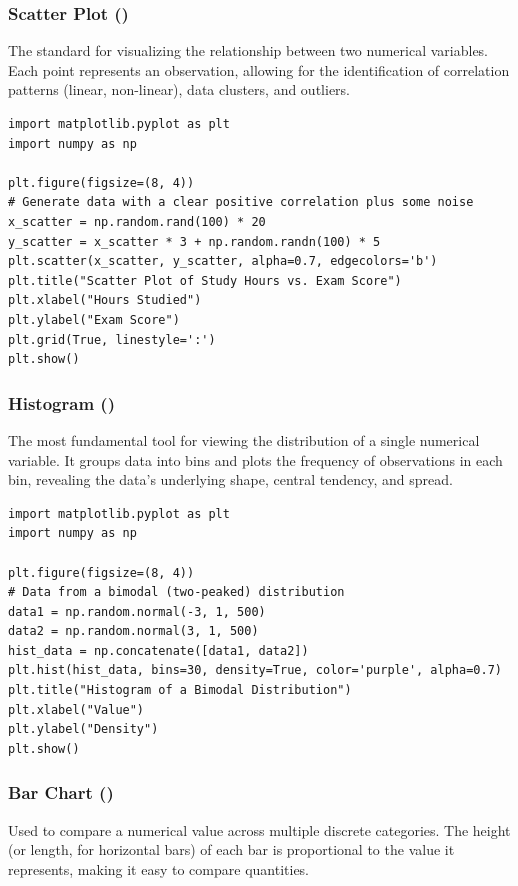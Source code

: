 \subsubsection*{Scatter Plot ()}
The standard for visualizing the relationship between two numerical variables. Each point represents an observation, allowing for the identification of correlation patterns (linear, non-linear), data clusters, and outliers.

\begin{example}
\text{ }\begin{verbatim}
import matplotlib.pyplot as plt
import numpy as np

plt.figure(figsize=(8, 4))
# Generate data with a clear positive correlation plus some noise
x_scatter = np.random.rand(100) * 20
y_scatter = x_scatter * 3 + np.random.randn(100) * 5
plt.scatter(x_scatter, y_scatter, alpha=0.7, edgecolors='b')
plt.title("Scatter Plot of Study Hours vs. Exam Score")
plt.xlabel("Hours Studied")
plt.ylabel("Exam Score")
plt.grid(True, linestyle=':')
plt.show()
\end{verbatim}
\end{example}

\subsubsection*{Histogram ()}
The most fundamental tool for viewing the distribution of a single numerical variable. It groups data into bins and plots the frequency of observations in each bin, revealing the data's underlying shape, central tendency, and spread.

\begin{example}
\text{ }\begin{verbatim}
import matplotlib.pyplot as plt
import numpy as np

plt.figure(figsize=(8, 4))
# Data from a bimodal (two-peaked) distribution
data1 = np.random.normal(-3, 1, 500)
data2 = np.random.normal(3, 1, 500)
hist_data = np.concatenate([data1, data2])
plt.hist(hist_data, bins=30, density=True, color='purple', alpha=0.7)
plt.title("Histogram of a Bimodal Distribution")
plt.xlabel("Value")
plt.ylabel("Density")
plt.show()
\end{verbatim}
\end{example}

\subsubsection*{Bar Chart ()}
Used to compare a numerical value across multiple discrete categories. The height (or length, for horizontal bars) of each bar is proportional to the value it represents, making it easy to compare quantities.

